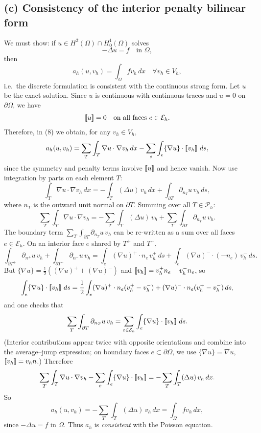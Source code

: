 \subsection*{(c) Consistency of the interior penalty bilinear form}
We must show: if $u\in H^2(\Omega)\cap H^1_0(\Omega)$ solves
\[
    - \Delta u = f \quad\text{in }\Omega,
\]
then
\[
    a_h(u,v_h) = \int_\Omega f v_h\,dx
    \quad \forall v_h\in V_h,
\]
i.e.\ the discrete formulation is consistent with the continuous strong form.
Let $u$ be the exact solution.
Since $u$ is continuous with continuous traces and $u=0$ on $\partial\Omega$,
we have
\[
    \left[\!\left[ u \right]\!\right] = 0 \quad \text{on all faces } e\in\mathcal{E}_h.
\]
Therefore, in (8) we obtain, for any $v_h\in V_h$,
\[
    a_h(u,v_h)
    = \sum_{T} \int_T \nabla u\cdot \nabla v_h\,dx
    - \sum_{e} \int_e \{\nabla u\}\cdot \left[\!\left[ v_h \right]\!\right]\,ds,
\]
since the symmetry and penalty terms involve $\left[\!\left[ u \right]\!\right]$ and hence vanish.
Now use integration by parts on each element $T$:
\[
    \int_T \nabla u\cdot \nabla v_h\,dx
    = - \int_T (\Delta u)\, v_h\,dx + \int_{\partial T} \partial_{n_T}u\, v_h\,ds,
\]
where $n_T$ is the outward unit normal on $\partial T$.
Summing over all $T\in\mathcal{P}_h$:
\[
    \sum_T \int_T \nabla u\cdot \nabla v_h
    = - \sum_T \int_T (\Delta u)\, v_h
    + \sum_T \int_{\partial T} \partial_{n_T}u\, v_h.
\]
The boundary term $\sum_T\int_{\partial T} \partial_{n_T}u\, v_h$ can be
re-written as a sum over all faces $e\in\mathcal{E}_h$.
On an interior face $e$ shared by $T^+$ and $T^-$,
\[
    \int_{\partial T^+} \partial_{n^+}u\, v_h
    + \int_{\partial T^-} \partial_{n^-}u\, v_h
    = \int_e (\nabla u)^+\cdot n_e\, v_h^+\,ds
    + \int_e (\nabla u)^-\cdot (-n_e)\, v_h^-\,ds.
\]
But $\{\nabla u\} = \frac{1}{2}((\nabla u)^+ + (\nabla u)^-)$ and
$\left[\!\left[ v_h \right]\!\right] = v_h^+ n_e - v_h^- n_e$, so
\[
    \int_e \{\nabla u\}\cdot \left[\!\left[ v_h \right]\!\right]\,ds
    = \frac{1}{2}\int_e (\nabla u)^+\cdot n_e (v_h^+ - v_h^-)
    + (\nabla u)^-\cdot n_e (v_h^+ - v_h^-)\,ds,
\]
and one checks that
\[
    \sum_{T} \int_{\partial T}  \partial_{n_T}u\, v_h
    = \sum_{e\in\mathcal{E}_h} \int_e \{\nabla u\}\cdot \left[\!\left[ v_h \right]\!\right]\,ds.
\]
(Interior contributions appear twice with opposite orientations and
combine into the average--jump expression; on boundary faces $e\subset\partial\Omega$,
we use $\{\nabla u\} = \nabla u$, $\left[\!\left[ v_h \right]\!\right]=v_h n$.)
Therefore
\[
    \sum_T \int_T \nabla u\cdot \nabla v_h
    - \sum_e \int_e \{\nabla u\}\cdot \left[\!\left[ v_h \right]\!\right]
    = - \sum_T \int_T (\Delta u)\, v_h\,dx.
\]
So
\[
    a_h(u,v_h)
    = - \sum_T \int_T (\Delta u)\, v_h\,dx
    = \int_\Omega f v_h\,dx,
\]
since $- \Delta u = f$ in $\Omega$.
Thus $a_h$ is \emph{consistent} with the Poisson equation.
